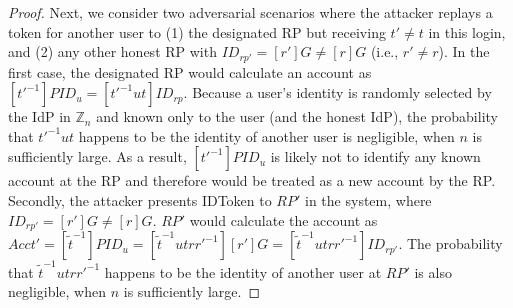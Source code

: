 \documentclass[letterpaper,onecolumn,10pt]{article}
\begin{document}
\begin{proof}
  Next, we consider two adversarial scenarios where the 
  attacker replays a token for another user to (1) the 
  designated RP but receiving $t'\neq t$ in this login, and 
  (2) any other honest RP with $ID_{rp'} = [r']G \neq [r]G$ 
  (i.e., $r' \neq r$). In the first case, the designated RP 
  would calculate an account as $[t'^{-1}]PID_u = [t'^{-1}ut]ID_{rp}$.
  Because a user's identity is randomly selected by the IdP 
  in $\mathbb{Z}_n$ and known only to the user (and the honest 
  IdP), the probability that $t'^{-1}ut$ happens to be the 
  identity of another user is negligible, when $n$ is 
  sufficiently large. As a result, $[t'^{-1}]PID_u$ is likely 
  not to identify any known account at the RP and therefore 
  would be treated as a new account by the RP. 
  Secondly, the attacker presents IDToken to $RP'$ in the 
  system, where $ID_{rp'} = [r']G \neq [r]G$. $RP'$ would 
  calculate the account as $Acct' = [\tilde{t}^{-1}]PID_{u} = 
  [\tilde{t}^{-1}utrr'^{-1}][r']G = 
  [\tilde{t}^{-1}utrr'^{-1}]ID_{rp'}$. 
  The probability that $\tilde{t}^{-1}utrr'^{-1}$ happens to 
  be the identity of another user at $RP'$ is also negligible, 
  when $n$ is sufficiently large. 
\hfill
\end{proof}
\end{document}
